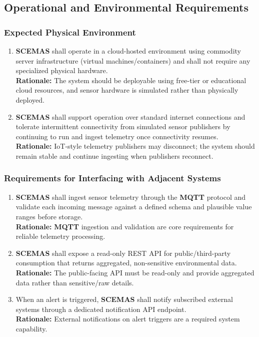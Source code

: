\documentclass[]{article}
\begin{document}
\subsection{Operational and Environmental Requirements}
\label{sub:operational_and_environmental_requirements}

\subsubsection{Expected Physical Environment}
\label{ssub:expected_physical_environment}
\begin{enumerate}[{OE-EPE}1. ]
	\item \textbf{SCEMAS} shall operate in a cloud-hosted environment using commodity server infrastructure (virtual machines/containers) and shall not require any specialized physical hardware.\\
    \textbf{Rationale:} The system should be deployable using free-tier or educational cloud resources, and sensor hardware is simulated rather than physically deployed.
    
	\item \textbf{SCEMAS} shall support operation over standard internet connections and tolerate intermittent connectivity from simulated sensor publishers by continuing to run and ingest telemetry once connectivity resumes.\\
    \textbf{Rationale:} IoT-style telemetry publishers may disconnect; the system should remain stable and continue ingesting when publishers reconnect.
\end{enumerate}

\subsubsection{Requirements for Interfacing with Adjacent Systems}
\label{ssub:requirements_for_interfacing_with_adjacent_systems}
\begin{enumerate}[{OE-IA}1. ]
	\item \textbf{SCEMAS} shall ingest sensor telemetry through the \textbf{MQTT} protocol and validate each incoming message against a defined schema and plausible value ranges before storage.\\
    \textbf{Rationale:} \textbf{MQTT} ingestion and validation are core requirements for reliable telemetry processing.
    
	\item \textbf{SCEMAS} shall expose a read-only REST API for public/third-party consumption that returns aggregated, non-sensitive environmental data.\\
    \textbf{Rationale:} The public-facing API must be read-only and provide aggregated data rather than sensitive/raw details.
    
	\item When an alert is triggered, \textbf{SCEMAS} shall notify subscribed external systems through a dedicated notification API endpoint.\\
    \textbf{Rationale:} External notifications on alert triggers are a required system capability.
\end{enumerate}
\end{document}
